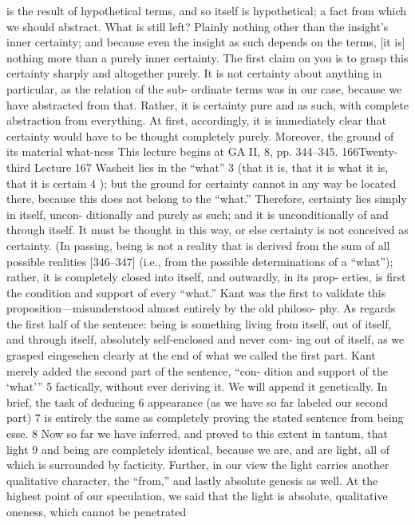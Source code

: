 is the result of hypothetical terms, and so itself is hypothetical; a fact from
which we should abstract. What is still left? Plainly nothing other than the
insight’s inner certainty; and because even the insight as such depends on the
terms, [it is] nothing more than a purely inner certainty.
The first claim on you is to grasp this certainty sharply and altogether
purely. It is not certainty about anything in particular, as the relation of the sub-
ordinate terms was in our case, because we have abstracted from that. Rather,
it is certainty pure and as such, with complete abstraction from everything.
At first, accordingly, it is immediately clear that certainty would have to
be thought completely purely. Moreover, the ground of its material what-ness
This lecture begins at GA II, 8, pp. 344–345.
166Twenty-third Lecture
167
{Washeit} lies in the “what” 3 (that it is, that it is what it is, that it is certain 4 );
but the ground for certainty cannot in any way be located there, because this
does not belong to the “what.” Therefore, certainty lies simply in itself, uncon-
ditionally and purely as such; and it is unconditionally of and through itself.
It must be thought in this way, or else certainty is not conceived as certainty.
(In passing, being is not a reality that is derived from the sum of all
possible realities [346–347] (i.e., from the possible determinations of a
“what”); rather, it is completely closed into itself, and outwardly, in its prop-
erties, is first the condition and support of every “what.” Kant was the first to
validate this proposition—misunderstood almost entirely by the old philoso-
phy. As regards the first half of the sentence: being is something living from
itself, out of itself, and through itself, absolutely self-enclosed and never com-
ing out of itself, as we grasped {eingesehen} clearly at the end of what we
called the first part. Kant merely added the second part of the sentence, “con-
dition and support of the ‘what’” 5 factically, without ever deriving it. We will
append it genetically. In brief, the task of deducing 6 appearance (as we have so
far labeled our second part) 7 is entirely the same as completely proving the
stated sentence from being {esse}. 8 Now so far we have inferred, and proved
to this extent {in tantum}, that light 9 and being are completely identical,
because we are, and are light, all of which is surrounded by facticity. Further,
in our view the light carries another qualitative character, the “from,” and
lastly absolute genesis as well. At the highest point of our speculation, we said
that the light is absolute, qualitative oneness, which cannot be penetrated
